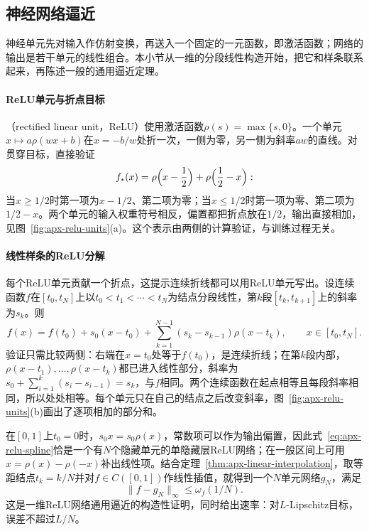 \subsection{神经网络逼近}
\label{sec:apx-neural}

神经单元先对输入作仿射变换，再送入一个固定的一元函数，即激活函数；网络的输出是若干单元的线性组合。本小节从一维的分段线性构造开始，把它和样条联系起来，再陈述一般的通用逼近定理。

\paragraph{ReLU单元与折点目标}

（rectified linear unit，ReLU）使用激活函数$\rho(s)=\max\{s,0\}$。一个单元$x\mapsto a\rho(wx+b)$在$x=-b/w$处折一次，一侧为零，另一侧为斜率$aw$的直线。对贯穿目标，直接验证
\[
  f_*(x)=\rho\Bigl(x-\frac12\Bigr)+\rho\Bigl(\frac12-x\Bigr):
\]
当$x\ge1/2$时第一项为$x-1/2$、第二项为零；当$x\le1/2$时第一项为零、第二项为$1/2-x$。两个单元的输入权重符号相反，偏置都把折点放在$1/2$，输出直接相加，见图~\ref{fig:apx-relu-units}(a)。这个表示由两侧的计算验证，与训练过程无关。

\paragraph{线性样条的ReLU分解}

每个ReLU单元贡献一个折点，这提示连续折线都可以用ReLU单元写出。设连续函数$f$在$[t_0,t_N]$上以$t_0<t_1<\cdots<t_N$为结点分段线性，第$k$段$[t_k,t_{k+1}]$上的斜率为$s_k$。则
\begin{equation}
  f(x)=f(t_0)+s_0(x-t_0)+\sum_{k=1}^{N-1}(s_k-s_{k-1})\rho(x-t_k),\qquad x\in[t_0,t_N].
  \label{eq:apx-relu-spline}
\end{equation}
验证只需比较两侧：右端在$x=t_0$处等于$f(t_0)$，是连续折线；在第$k$段内部，$\rho(x-t_1),\ldots,\rho(x-t_k)$都已进入线性部分，斜率为$s_0+\sum_{i=1}^k(s_i-s_{i-1})=s_k$，与$f$相同。两个连续函数在起点相等且每段斜率相同，所以处处相等。每个单元只在自己的结点之后改变斜率，图~\ref{fig:apx-relu-units}(b)画出了逐项相加的部分和。

在$[0,1]$上$t_0=0$时，$s_0x=s_0\rho(x)$，常数项可以作为输出偏置，因此式~\eqref{eq:apx-relu-spline}恰是一个有$N$个隐藏单元的单隐藏层ReLU网络；在一般区间上可用$x=\rho(x)-\rho(-x)$补出线性项。结合定理~\ref{thm:apx-linear-interpolation}，取等距结点$t_k=k/N$并对$f\in C([0,1])$作线性插值，就得到一个$N$单元网络$g_N$，满足
\[
  \|f-g_N\|_\infty\le\omega_f(1/N).
\]
这是一维ReLU网络通用逼近的构造性证明，同时给出速率：对$L$-Lipschitz目标，误差不超过$L/N$。

